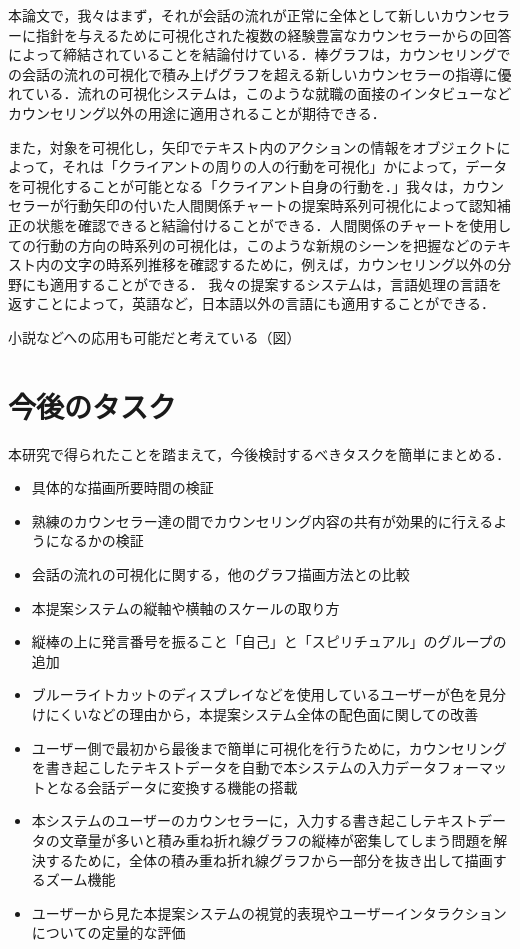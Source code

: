 \documentclass[shuuron]{kuee}
\begin{document}

本論文で，我々はまず，それが会話の流れが正常に全体として新しいカウンセラーに指針を与えるために可視化された複数の経験豊富なカウンセラーからの回答によって締結されていることを結論付けている．棒グラフは，カウンセリングでの会話の流れの可視化で積み上げグラフを超える新しいカウンセラーの指導に優れている．流れの可視化システムは，このような就職の面接のインタビューなどカウンセリング以外の用途に適用されることが期待できる．

  また，対象を可視化し，矢印でテキスト内のアクションの情報をオブジェクトによって，それは「クライアントの周りの人の行動を可視化」かによって，データを可視化することが可能となる「クライアント自身の行動を．」我々は，カウンセラーが行動矢印の付いた人間関係チャートの提案時系列可視化によって認知補正の状態を確認できると結論付けることができる．人間関係のチャートを使用しての行動の方向の時系列の可視化は，このような新規のシーンを把握などのテキスト内の文字の時系列推移を確認するために，例えば，カウンセリング以外の分野にも適用することができる．
    我々の提案するシステムは，言語処理の言語を返すことによって，英語など，日本語以外の言語にも適用することができる．

小説などへの応用も可能だと考えている（図）

\section{今後のタスク}

本研究で得られたことを踏まえて，今後検討するべきタスクを簡単にまとめる．

\begin{itemize}
\item 具体的な描画所要時間の検証
\item 熟練のカウンセラー達の間でカウンセリング内容の共有が効果的に行えるようになるかの検証
\item 会話の流れの可視化に関する，他のグラフ描画方法との比較
\item 本提案システムの縦軸や横軸のスケールの取り方
\item 縦棒の上に発言番号を振ること「自己」と「スピリチュアル」のグループの追加
\item ブルーライトカットのディスプレイなどを使用しているユーザーが色を見分けにくいなどの理由から，本提案システム全体の配色面に関しての改善
\item ユーザー側で最初から最後まで簡単に可視化を行うために，カウンセリングを書き起こしたテキストデータを自動で本システムの入力データフォーマットとなる会話データに変換する機能の搭載
\item 本システムのユーザーのカウンセラーに，入力する書き起こしテキストデータの文章量が多いと積み重ね折れ線グラフの縦棒が密集してしまう問題を解決するために，全体の積み重ね折れ線グラフから一部分を抜き出して描画するズーム機能
\item ユーザーから見た本提案システムの視覚的表現やユーザーインタラクションについての定量的な評価
\end{itemize}
\end{document}
